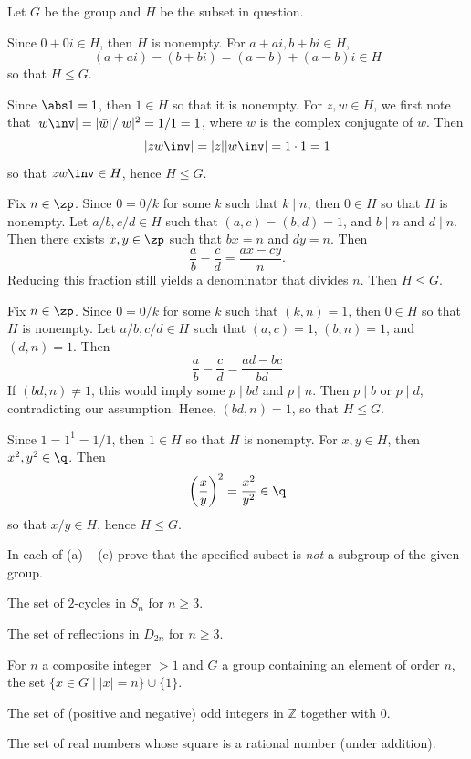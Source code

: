 \begin{sol}
    Let $G$ be the group and $H$ be the subset in question.
    \begin{subproblems}
        \item Since $0 + 0i \in H$, then $H$ is nonempty. For $a + ai, b + bi \in H$,
        \[(a + ai) - (b + bi) = (a - b) + (a - b)i \in H\]
        so that $H \leq G$.
        \item Since $\abs 1 = 1$, then $1 \in H$ so that it is nonempty. For $z, w \in H$, we first note that $|w\inv| = |\bar w|/|w|^2 = 1/1 = 1$, where $\bar w$ is the complex conjugate of $w$. Then
        \[|zw\inv| = |z||w\inv| = 1 \cdot 1 = 1\]
        so that $zw\inv \in H$, hence $H \leq G$.
        \item Fix $n \in \zp$. Since $0 = 0/k$ for some $k$ such that $k \mid n$, then $0 \in H$ so that $H$ is nonempty. Let $a/b, c/d \in H$ such that $(a, c) = (b, d) = 1$, and $b \mid n$ and $d \mid n$. Then there exists $x, y \in \zp$ such that $bx = n$ and $dy = n$. Then
        \[\frac ab - \frac cd = \frac{ax - cy}{n}.\]
        Reducing this fraction still yields a denominator that divides $n$. Then $H \leq G$.
        \item Fix $n \in \zp$. Since $0 = 0/k$ for some $k$ such that $(k, n) = 1$, then $0 \in H$ so that $H$ is nonempty. Let $a/b, c/d \in H$ such that $(a, c) = 1$, $(b, n) = 1$, and $(d, n) = 1$. Then
        \[\frac ab - \frac cd = \frac{ad - bc}{bd}\]
        If $(bd, n) \neq 1$, this would imply some $p \mid bd$ and $p \mid n$. Then $p \mid b$ or $p \mid d$, contradicting our assumption. Hence, $(bd, n) = 1$, so that $H \leq G$.
        \item Since $1 = 1^1 = 1/1$, then $1 \in H$ so that $H$ is nonempty. For $x, y \in H$, then $x^2, y^2 \in \q$. Then
        \[\left(\frac xy\right)^2 = \frac{x^2}{y^2} \in \q\]
        so that $x/y \in H$, hence $H \leq G$. \qh
    \end{subproblems}
\end{sol}

\begin{exercise}\label{ex2.1.2}
    In each of (a) -- (e) prove that the specified subset is \emph{not} a subgroup of the given group.
    \begin{subproblems}
        \item The set of $2$-cycles in $S_n$ for $n \ge 3$.
        \item The set of reflections in $D_{2n}$ for $n \ge 3$.
        \item For $n$ a composite integer $>1$ and $G$ a group containing an element of order $n$, the set $\{x \in G \mid |x| = n\} \cup \{1\}$.
        \item The set of (positive and negative) odd integers in $\mathbb{Z}$ together with $0$.
        \item The set of real numbers whose square is a rational number (under addition).
    \end{subproblems}
\end{exercise}

